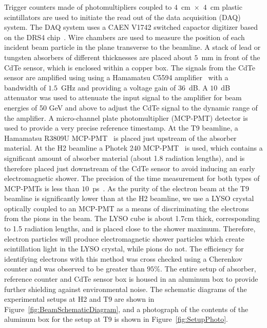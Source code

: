 Trigger counters made of photomultipliers coupled to $4$~$\mathrm{cm}$~$\times$~$4$~$\mathrm{cm}$ 
plastic scintillators are used 
to initiate the read out of the data acquisition (DAQ) system. The DAQ system
uses a CAEN V1742 switched capactor digitizer based on the DRS4 chip~\cite{DRS4}. Wire chambers
are used to measure the position of each incident beam particle in the plane transverse
to the beamline. A stack of lead or tungsten absorbers of different thicknesses are 
placed about $5$~mm in front of the CdTe sensor, which is 
enclosed within a copper box. The signals from the CdTe sensor are amplified using 
using a Hamamatsu C5594 amplifier~\cite{HamaAmpDataSheet} with a bandwidth of
$1.5$~GHz and providing a voltage gain of $36$~dB. A $10$~dB attenuator was used to attenuate the input signal 
to the amplifier for beam energies of 50 GeV and above to adjust the CdTe signal to the dynamic range of the amplifier. 
A micro-channel plate photomultiplier (MCP-PMT)
detector is used to provide a very precise reference timestamp. At the T9 beamline,
a Hamamatsu R3809U MCP-PMT~\cite{HamaMCPDataSheet} is placed just upstream of the absorber material. 
At the H2 beamline a Photek 240 MCP-PMT~\cite{PhotekDataSheet} is used, which contains a significant 
amount of absorber material (about 1.8 radiation lengths), and is therefore placed 
just downstream of the CdTe sensor to avoid inducing an early electromagnetic shower.
The precision of the time measurement for both types of MCP-PMTs is less than 
$10$~ps~\cite{MCPShowerMaxPaper,Anderson:2015gha}. As the purity of the electron beam at the T9 beamline is
significantly lower than at the H2 beamline, we use a LYSO crystal
optically coupled to an MCP-PMT as a means of discriminating the electrons from the pions
in the beam. The LYSO cube is about 1.7cm thick, corresponding to 1.5 radiation lengths, 
and is placed close to the shower maximum. Therefore, electron particles will produce 
electromagnetic shower particles which create scintillation light in the LYSO crystal, 
while pions do not. The efficiency for identifying electrons with this method was 
cross checked using a Cherenkov counter and was observed to be greater than $95\%$.
The entire setup of absorber, reference counter and CdTe sensor box is housed in an aluminum
box to provide further shielding against environmental noise.
The schematic diagrams of the experimental setups at H2 and T9 
are shown in Figure~\ref{fig:BeamSchematicDiagram}, and a photograph
of the contents of the aluminum box for the setup at T9 is shown in 
Figure~\ref{fig:SetupPhoto}.


